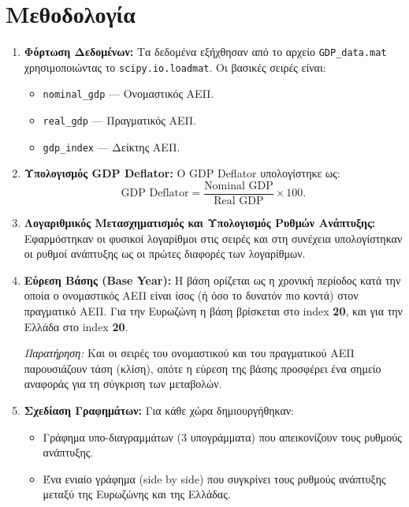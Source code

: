 \documentclass{article}
\begin{document}
\section{Μεθοδολογία}
\begin{enumerate}
    \item \textbf{Φόρτωση Δεδομένων:} Τα δεδομένα εξήχθησαν από το αρχείο \texttt{GDP\_data.mat} χρησιμοποιώντας το \texttt{scipy.io.loadmat}. Οι βασικές σειρές είναι:
    \begin{itemize}
       \item \texttt{nominal\_gdp} --- Ονομαστικός ΑΕΠ.
       \item \texttt{real\_gdp} --- Πραγματικός ΑΕΠ.
       \item \texttt{gdp\_index} --- Δείκτης ΑΕΠ.
    \end{itemize}
    \item \textbf{Υπολογισμός GDP Deflator:} Ο GDP Deflator υπολογίστηκε ως:
    \[
    \text{GDP Deflator} = \frac{\text{Nominal GDP}}{\text{Real GDP}} \times 100.
    \]
    \item \textbf{Λογαριθμικός Μετασχηματισμός και Υπολογισμός Ρυθμών Ανάπτυξης:} Εφαρμόστηκαν οι φυσικοί λογαρίθμοι στις σειρές και στη συνέχεια υπολογίστηκαν οι ρυθμοί ανάπτυξης ως οι πρώτες διαφορές των λογαρίθμων.
    \item \textbf{Εύρεση Βάσης (Base Year):} Η βάση ορίζεται ως η χρονική περίοδος κατά την οποία ο ονομαστικός ΑΕΠ είναι ίσος (ή όσο το δυνατόν πιο κοντά) στον πραγματικό ΑΕΠ. Για την Ευρωζώνη η βάση βρίσκεται στο index \textbf{20}, και για την Ελλάδα στο index \textbf{20}.
    
    \textit{Παρατήρηση:} Και οι σειρές του ονομαστικού και του πραγματικού ΑΕΠ παρουσιάζουν τάση (κλίση), οπότε η εύρεση της βάσης προσφέρει ένα σημείο αναφοράς για τη σύγκριση των μεταβολών.
    
    \item \textbf{Σχεδίαση Γραφημάτων:} Για κάθε χώρα δημιουργήθηκαν:
    \begin{itemize}
        \item Γράφημα υπο-διαγραμμάτων (3 υπογράμματα) που απεικονίζουν τους ρυθμούς ανάπτυξης.
        \item Ένα ενιαίο γράφημα (side by side) που συγκρίνει τους ρυθμούς ανάπτυξης μεταξύ της Ευρωζώνης και της Ελλάδας.
    \end{itemize}
\end{enumerate}
\end{document}

